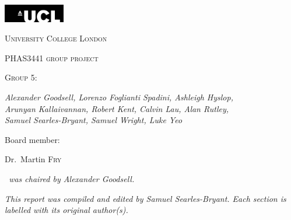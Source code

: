 \pagestyle{plain}

\begin{titlepage}
    \centering
    \includegraphics[width=0.2\textwidth]{Files/UCL}\par\vspace{1cm}
    {\scshape\LARGE University College London \par}
    \vspace{1cm}
    {\scshape PHAS3441 group project\par}
    {\scshape Group 5:~\teamname\par}
    \vspace{1.5cm}
    {\huge\bfseries {} \projectTitle\par}
    \vspace{2cm}
    {\Large\itshape Alexander Goodsell, Lorenzo Foglianti Spadini, Ashleigh Hyslop,\\ Arunyan Kallaivannan, Robert Kent, Calvin Lau, Alan Rutley,\\ Samuel Searles-Bryant, Samuel Wright, Luke Yeo\par}
    \vfill
    Board member:\par
    Dr.~Martin \textsc{Fry}

    \vfill

    {\large \thedate\par}
\end{titlepage}

{\centering
{\itshape \teamname~was chaired by Alexander Goodsell.\par}
\vfill
{\itshape This report was compiled and edited by Samuel Searles-Bryant. Each section is labelled with its original author(s).\par}
\vfill
}

\cleardoublepage

\tableofcontents
